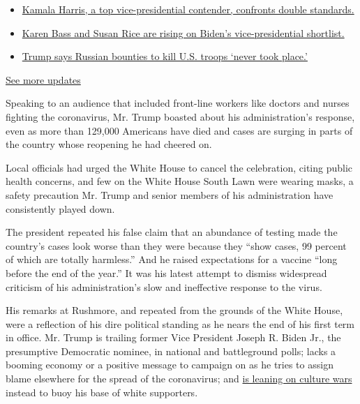 \begin{itemize}
\tightlist
\item
  \href{https://www.nytimes.com/2020/07/31/us/elections/biden-vs-trump.html?action=click\&pgtype=Article\&state=default\&region=MAIN_CONTENT_1\&context=storylines_live_updates\#link-29fdff45}{Kamala
  Harris, a top vice-presidential contender, confronts double
  standards.}
\item
  \href{https://www.nytimes.com/2020/07/31/us/elections/biden-vs-trump.html?action=click\&pgtype=Article\&state=default\&region=MAIN_CONTENT_1\&context=storylines_live_updates\#link-13ec3d9c}{Karen
  Bass and Susan Rice are rising on Biden's vice-presidential
  shortlist.}
\item
  \href{https://www.nytimes.com/2020/07/31/us/elections/biden-vs-trump.html?action=click\&pgtype=Article\&state=default\&region=MAIN_CONTENT_1\&context=storylines_live_updates\#link-49e9a016}{Trump
  says Russian bounties to kill U.S. troops `never took place.'}
\end{itemize}

\href{https://www.nytimes.com/2020/07/31/us/elections/biden-vs-trump.html?action=click\&pgtype=Article\&state=default\&region=MAIN_CONTENT_1\&context=storylines_live_updates}{See
more updates}

Speaking to an audience that included front-line workers like doctors
and nurses fighting the coronavirus, Mr. Trump boasted about his
administration's response, even as more than 129,000 Americans have died
and cases are surging in parts of the country whose reopening he had
cheered on.

Local officials had urged the White House to cancel the celebration,
citing public health concerns, and few on the White House South Lawn
were wearing masks, a safety precaution Mr. Trump and senior members of
his administration have consistently played down.

The president repeated his false claim that an abundance of testing made
the country's cases look worse than they were because they ``show cases,
99 percent of which are totally harmless.'' And he raised expectations
for a vaccine ``long before the end of the year.'' It was his latest
attempt to dismiss widespread criticism of his administration's slow and
ineffective response to the virus.

His remarks at Rushmore, and repeated from the grounds of the White
House, were a reflection of his dire political standing as he nears the
end of his first term in office. Mr. Trump is trailing former Vice
President Joseph R. Biden Jr., the presumptive Democratic nominee, in
national and battleground polls; lacks a booming economy or a positive
message to campaign on as he tries to assign blame elsewhere for the
spread of the coronavirus; and
\href{https://www.nytimes.com/2020/07/07/podcasts/the-daily/trump-mount-rushmore-speech.html}{is
leaning on culture wars} instead to buoy his base of white supporters.

